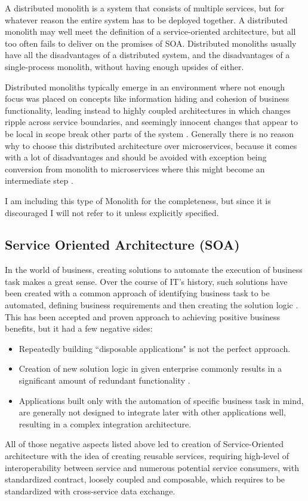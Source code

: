 A distributed monolith is a system that consists of multiple services, but for whatever reason the entire system has to be deployed together. A distributed monolith may well meet the definition of a service-oriented architecture, but all too often fails to deliver on the promises of SOA. Distributed monoliths usually have all the disadvantages of a distributed system, and the disadvantages of a single-process monolith, without having enough upsides of either. \cite{MON_TO_MS_MONOLITH}

Distributed monoliths typically emerge in an environment where not enough focus was placed on concepts like information hiding and cohesion of business functionality, leading instead to highly coupled architectures in which changes ripple across service boundaries, and seemingly innocent changes that appear to be local in scope break other parts of the system \cite{MON_TO_MS_MONOLITH}. Generally there is no reason why to choose this distributed architecture over microservices, because it comes with a lot of disadvantages and should be avoided with exception being conversion from monolith to microservices where this might become an intermediate step \cite{DIST_MON_WHICH_BUILDING}.

I am including this type of Monolith for the completeness, but since it is discouraged I will not refer to it unless explicitly specified.

\subsection{Service Oriented Architecture (SOA)}
In the world of business, creating solutions to automate the execution of business task makes a great sense. Over the course of IT's history, such solutions have been created with a common approach of identifying business task to be automated, defining business requirements and then creating the solution logic \cite{SERVICE_ORIENTED_ARCHITECTURE}. This has been accepted and proven approach to achieving positive business benefits, but it had a few negative sides:
\begin{itemize}
    \item  Repeatedly building ``disposable applications" is not the perfect approach.
    \item  Creation of new solution logic in given enterprise commonly results in a significant amount of redundant functionality \cite{SERVICE_ORIENTED_ARCHITECTURE}.
    \item Applications built only with the automation of specific business task in mind, are generally not designed to integrate later with other applications well, resulting in a complex integration architecture.
\end{itemize}
All of those negative aspects listed above led to creation of Service-Oriented architecture with the idea of creating reusable services, requiring high-level of interoperability between service and numerous potential service consumers, with standardized contract, loosely coupled and composable, which requires to be standardized with cross-service data exchange.


